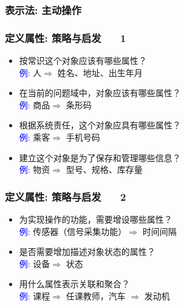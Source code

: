 \documentclass[compress]{beamer}
\begin{document}
\begin{frame}
  \frametitle{表示法: 主动操作}
\end{frame}

\begin{frame}
  \frametitle{定义属性: 策略与启发 ~~ 1}

    \begin{itemize}
      \item 按常识这个对象应该有哪些属性？\\
      \textcolor{blue}{例:}  人$\Rightarrow$ 姓名、地址、出生年月
      \item 在当前的问题域中，对象应该有哪些属性？ \\
        \textcolor{blue}{例:}  商品$\Rightarrow$ 条形码
      \item 根据系统责任，这个对象应具有哪些属性？ \\
        \textcolor{blue}{例:}  乘客$\Rightarrow$ 手机号码
      \item 建立这个对象是为了保存和管理哪些信息？ \\
        \textcolor{blue}{例:} 物资$\Rightarrow$ 型号、规格、库存量
  \end{itemize}
\end{frame}

\begin{frame}
  \frametitle{定义属性: 策略与启发 ~~ 2}
    \begin{itemize}
      \item 为实现操作的功能，需要增设哪些属性？ \\
        \textcolor{blue}{例:} 传感器（信号采集功能）$\Rightarrow$ 时间间隔
      \item 是否需要增加描述对象状态的属性？ \\
        \textcolor{blue}{例:} 设备$\Rightarrow$ 状态 
      \item 用什么属性表示关联和聚合？ \\
        \textcolor{blue}{例:} 课程$\Rightarrow$ 任课教师，汽车
        $\Rightarrow$ 发动机
  \end{itemize}
\end{frame}
\end{document}
